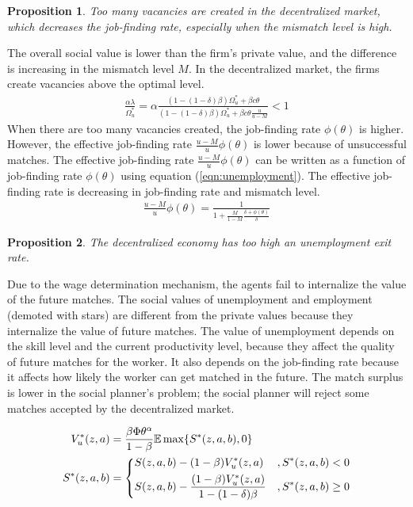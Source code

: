 \documentclass[12pt]{article}
\newtheorem{proposition}{Proposition}
\newcommand{\E}{\mathbb{E}}
\newcommand{\1}{\mathbb{1}}
\begin{document}
\begin{proposition}
Too many vacancies are created in the decentralized market, which decreases the job-finding rate, especially when the mismatch level is high.
\end{proposition}
The overall social value is lower than the firm's private value, and the difference is increasing in the mismatch level $M$. In the decentralized market, the firms create vacancies above the optimal level. 
\begin{align*}
\frac{\alpha\lambda}{\Omega_u^*} = \alpha\frac{(1-(1-\delta)\beta)\Omega_u^*+\beta c \theta}{(1-(1-\delta)\beta)\Omega_u^*+\beta c \theta\frac{u}{u-M}}<1
\end{align*}
When there are too many vacancies created, the job-finding rate $\phi(\theta)$ is higher. However, the effective job-finding rate $\frac{u-M}{u}\phi(\theta)$ is lower because of unsuccessful matches. The effective job-finding rate $\frac{u-M}{u}\phi(\theta)$ can be written as a function of job-finding rate $\phi(\theta)$ using equation (\ref{eqn:unemployment}). The effective job-finding rate is decreasing in job-finding rate and mismatch level. 
\begin{align*}
\frac{u-M}{u}\phi(\theta) = \frac{1}{1+\frac{M}{1-M}\frac{\delta+\phi(\theta)}{\delta}}
\end{align*}

\begin{proposition}
The decentralized economy has too high an unemployment exit rate. 
\end{proposition}
Due to the wage determination mechanism, the agents fail to internalize the value of the future matches. The social values of unemployment and employment (demoted with stars) are different from the private values because they internalize the value of future matches. The value of unemployment depends on the skill level and the current productivity level, because they affect the quality of future matches for the worker. It also depends on the job-finding rate because it affects how likely the worker can get matched in the future. The match surplus is lower in the social planner's problem; the social planner will reject some matches accepted by the decentralized market. 

\begin{align*}
V_u^*(z,a) &= \frac{\beta\Phi\theta^{\alpha}}{1-\beta}\E \max\{S^*(z,a,b),0\} \\
S^*(z,a,b) &= 
\begin{dcases}
S(z,a,b)-(1-\beta) V_u^*(z,a)&, S^*(z,a,b)<0\\
S(z,a,b)-\frac{(1-\beta) V_u^*(z,a)}{1-(1-\delta)\beta} &,  S^*(z,a,b) \geq 0 \\
\end{dcases}
\end{align*}
\end{document}
